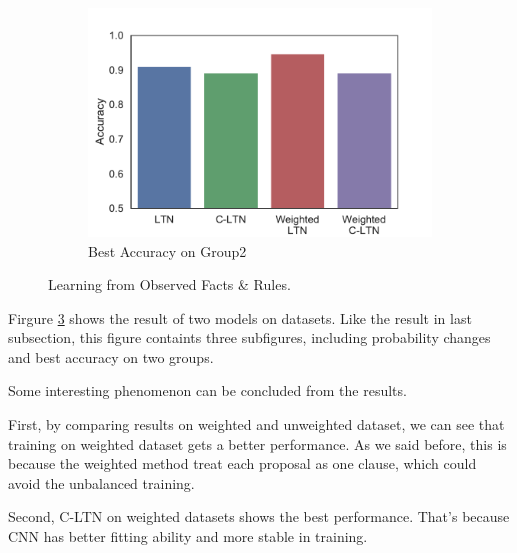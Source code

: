 \begin{figure}[!]
\begin{subfigure}[]{0.33\textwidth}
        \label{fig:learning-best-accuracy-1}
    \end{subfigure}~~~~
    \begin{subfigure}[]{0.33\textwidth}
        \includegraphics[width=\textwidth]{img/bar4.pdf}
        \caption{Best Accuracy on Group2}
        \label{fig:learning-best-accuracy-2}
    \end{subfigure}
    \caption{Learning from Observed Facts \& Rules.}
    \label{fig:learning}
\end{figure}

Firgure \ref{fig:learning} shows the result of two models on datasets. Like the result in last subsection, this figure containts three subfigures, including probability changes and best accuracy on two groups.

Some interesting phenomenon can be concluded from the results.

First, by comparing results on weighted and unweighted dataset, we can see that training on weighted dataset gets a better performance.
As we said before, this is because the weighted method treat each proposal as one clause, which could avoid the unbalanced training.

Second, C-LTN on weighted datasets shows the best performance. That's because CNN has better fitting ability and more stable in training.


